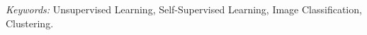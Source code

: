 \documentclass[12pt]{article}
\begin{document}
\noindent%
{\it Keywords:} Unsupervised Learning, Self-Supervised Learning, Image
Classification, Clustering.
\vfill

\newpage









\label{sec:meth}





\newpage



\end{document}
